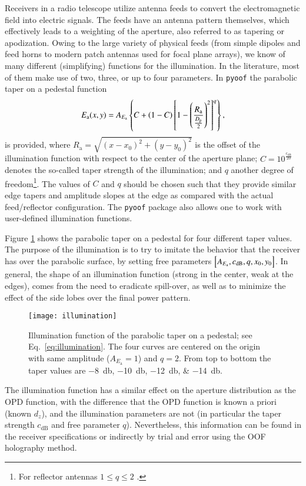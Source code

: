 \documentclass[
    ]
    {aa}
\begin{document}
    Receivers in a radio telescope utilize antenna feeds to convert the electromagnetic field into electric signals. The feeds have an antenna pattern themselves, which effectively leads to a weighting of the aperture, also referred to as tapering or apodization. Owing to the large variety of physical feeds (from simple dipoles and feed horns to modern patch antennas used for focal plane arrays), we know of many different (simplifying) functions for the illumination. In the literature, most of them make use of two, three, or up to four parameters. In \texttt{pyoof} the parabolic taper on a pedestal function \citep[see][Chapter~7]{stutzman1998antenna}
    \begin{equation}
        E_\text{a}(x, y) = A_{E_\text{a}}\cbr{C + \del{1-C} \sbr{1 - \del{\frac{R_\text{a}}{\frac{D_\text{p}}{2}}}^2 }^q },
        \label{eq:illumination}
    \end{equation}
    is provided, where $R_\text{a}=\sqrt{(x-x_0)^2+(y-y_0)^2}$ is the offset of the illumination function with respect to the center of the aperture plane; $C=10^{\frac{c_\text{dB}}{20}}$ denotes the so-called taper strength of the illumination; and $q$ another degree of freedom\footnote{For reflector antennas $1\leq q \leq 2$ \citep[see][Chapter~15]{lo2013antenna}.}. The values of $C$ and $q$ should be chosen such that they provide similar edge tapers and amplitude slopes at the edge as compared with the actual feed/reflector configuration.
    The \texttt{pyoof} package also allows one to work with user-defined illumination functions.

    Figure \ref{fig:illumination} shows the parabolic taper on a pedestal for four different taper values. The purpose of the illumination is to try to imitate the behavior that the receiver has over the parabolic surface, by setting free parameters $\sbr{A_{E_\text{a}}, c_\text{dB}, q , x_0, y_0}$. 
    In general, the shape of an illumination function (strong in the center, weak at the edges), comes from the need to eradicate spill-over, as well as to minimize the effect of the side lobes over the final power pattern.
    \begin{figure}
        \centering
        \texttt{[image: illumination]}
        \caption{Illumination function of the parabolic taper on a pedestal; see Eq.~\eqref{eq:illumination}. The four curves are centered on the origin with same amplitude ($A_{E_\text{a}}=1$) and $q=2$. From top to bottom the taper values are \SIlist{-8;-10;-12;-14}{\decibel}.}
        \label{fig:illumination}
    \end{figure}
    The illumination function has a similar effect on the aperture distribution as the OPD function, with the difference that the OPD function is known a priori (known $d_z$), and the illumination parameters are not (in particular the taper strength $c_\text{dB}$ and free parameter $q$). Nevertheless, this information can be found in the receiver specifications or indirectly by trial and error using the OOF holography method.
\end{document}
